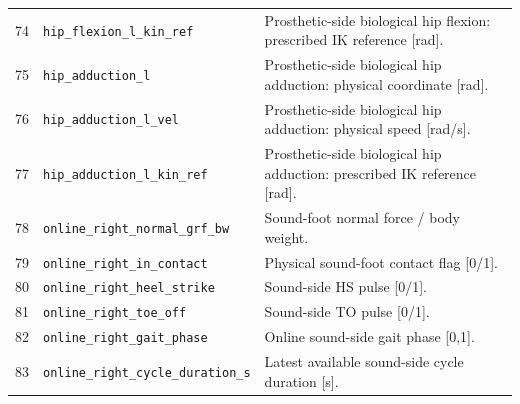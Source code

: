 {\begin{longtable}{@{}r p{7.2cm} p{7.5cm}@{}}
74 & {\fontsize{7.6}{9.2}\selectfont\texttt{hip\_\allowbreak{}flexion\_\allowbreak{}l\_\allowbreak{}kin\_\allowbreak{}ref}} & Prosthetic-side biological hip flexion: prescribed IK reference [rad].\\
75 & {\fontsize{7.6}{9.2}\selectfont\texttt{hip\_\allowbreak{}adduction\_\allowbreak{}l}} & Prosthetic-side biological hip adduction: physical coordinate [rad].\\
76 & {\fontsize{7.6}{9.2}\selectfont\texttt{hip\_\allowbreak{}adduction\_\allowbreak{}l\_\allowbreak{}vel}} & Prosthetic-side biological hip adduction: physical speed [rad/s].\\
77 & {\fontsize{7.6}{9.2}\selectfont\texttt{hip\_\allowbreak{}adduction\_\allowbreak{}l\_\allowbreak{}kin\_\allowbreak{}ref}} & Prosthetic-side biological hip adduction: prescribed IK reference [rad].\\
78 & {\fontsize{7.6}{9.2}\selectfont\texttt{online\_\allowbreak{}right\_\allowbreak{}normal\_\allowbreak{}grf\_\allowbreak{}bw}} & Sound-foot normal force / body weight.\\
79 & {\fontsize{7.6}{9.2}\selectfont\texttt{online\_\allowbreak{}right\_\allowbreak{}in\_\allowbreak{}contact}} & Physical sound-foot contact flag [0/1].\\
80 & {\fontsize{7.6}{9.2}\selectfont\texttt{online\_\allowbreak{}right\_\allowbreak{}heel\_\allowbreak{}strike}} & Sound-side HS pulse [0/1].\\
81 & {\fontsize{7.6}{9.2}\selectfont\texttt{online\_\allowbreak{}right\_\allowbreak{}toe\_\allowbreak{}off}} & Sound-side TO pulse [0/1].\\
82 & {\fontsize{7.6}{9.2}\selectfont\texttt{online\_\allowbreak{}right\_\allowbreak{}gait\_\allowbreak{}phase}} & Online sound-side gait phase [0,1].\\
83 & {\fontsize{7.6}{9.2}\selectfont\texttt{online\_\allowbreak{}right\_\allowbreak{}cycle\_\allowbreak{}duration\_\allowbreak{}s}} & Latest available sound-side cycle duration [s].\\
\bottomrule\end{longtable}
}
